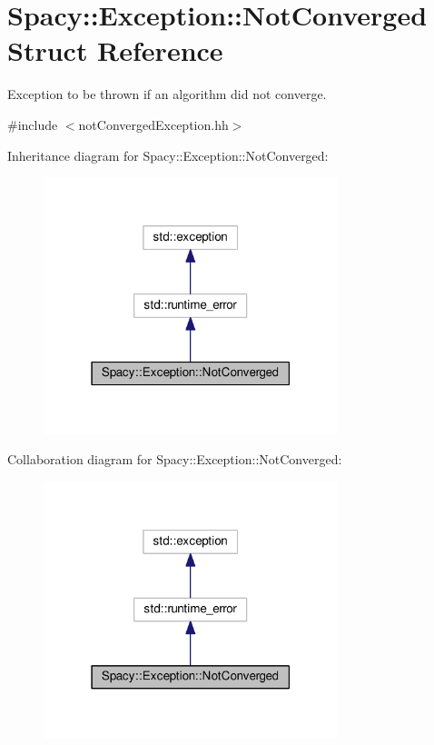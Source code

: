 \hypertarget{structSpacy_1_1Exception_1_1NotConverged}{}\section{Spacy\+:\+:Exception\+:\+:Not\+Converged Struct Reference}
\label{structSpacy_1_1Exception_1_1NotConverged}


Exception to be thrown if an algorithm did not converge.  




{\ttfamily \#include $<$not\+Converged\+Exception.\+hh$>$}



Inheritance diagram for Spacy\+:\+:Exception\+:\+:Not\+Converged\+:\nopagebreak
\begin{figure}[H]
\begin{center}
\leavevmode
\includegraphics[width=243pt]{structSpacy_1_1Exception_1_1NotConverged__inherit__graph}
\end{center}
\end{figure}


Collaboration diagram for Spacy\+:\+:Exception\+:\+:Not\+Converged\+:\nopagebreak
\begin{figure}[H]
\begin{center}
\leavevmode
\includegraphics[width=243pt]{structSpacy_1_1Exception_1_1NotConverged__coll__graph}
\end{center}
\end{figure}

